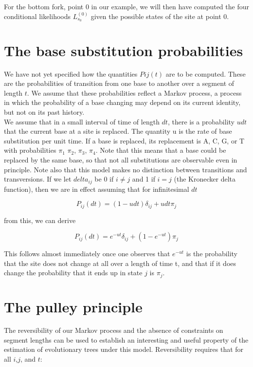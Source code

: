 For the bottom fork, point 0 in our example, we will then have computed the four conditional likelihoods $L_{s_0}^{(0)}$ given the possible states of the site at point 0.

\section{The base substitution probabilities}
We have not yet specified how the quantities $Pij(t)$ are to be computed. These are the probabilities of transition from one base to another over a segment of length $t$. We assume that these probabilities reflect a Markov process, a process in which the probability of a base changing may depend on its current identity, but not on its past history.
\\
We assume that in a small interval of time of length $dt$, there is a probability $u dt$ that the current base at a site is replaced. The quantity u is the rate of base substitution per unit time.
If a base is replaced, its replacement is A, C, G, or T with probabilities $\pi_1$ $\pi_2$, $\pi_3$, $\pi_4$. Note that this means that a base could be replaced
by the same base, so that not all substitutions are observable even in principle. Note also that this model makes no distinction between transitions and transversions. If we let $delta_{ij}$ be $0$ if $i \neq j$ and 1 if $i = j$ (the
Kronecker delta function), then we are in effect assuming that for infinitesimal $dt$

\begin{equation}
P_{ij}(dt) = (1- u dt) \delta_{ij} + u dt \pi_j
\end{equation}

from this, we can derive

\begin{equation}\label{eq:7}
P_{ij}(dt) = e^{-ut} \delta_{ij} + (1- e^{-ut}) \pi_j
\end{equation}

This follows almost immediately once one observes that $e^{-ut}$ is the probability that the site does not change at all over a length of time t, and that if it does change the probability that it ends up in state $j$ is $\pi_j$.

\section{The pulley principle}
The reversibility of our Markov process and the absence of constraints on segment lengths can be used to establish an interesting and useful property of the estimation of evolutionary trees under this model.
Reversibility requires that for all $i$,$j$, and $t$:

